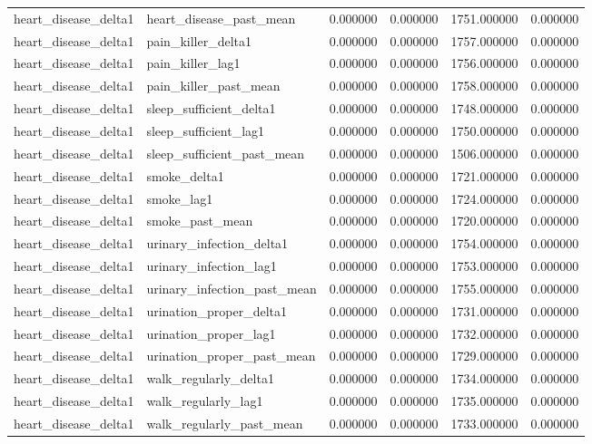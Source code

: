 \begin{longtable}{llrrrr}
heart\_disease\_delta1 & heart\_disease\_past\_mean & 0.000000 & 0.000000 & 1751.000000 & 0.000000 \\
heart\_disease\_delta1 & pain\_killer\_delta1 & 0.000000 & 0.000000 & 1757.000000 & 0.000000 \\
heart\_disease\_delta1 & pain\_killer\_lag1 & 0.000000 & 0.000000 & 1756.000000 & 0.000000 \\
heart\_disease\_delta1 & pain\_killer\_past\_mean & 0.000000 & 0.000000 & 1758.000000 & 0.000000 \\
heart\_disease\_delta1 & sleep\_sufficient\_delta1 & 0.000000 & 0.000000 & 1748.000000 & 0.000000 \\
heart\_disease\_delta1 & sleep\_sufficient\_lag1 & 0.000000 & 0.000000 & 1750.000000 & 0.000000 \\
heart\_disease\_delta1 & sleep\_sufficient\_past\_mean & 0.000000 & 0.000000 & 1506.000000 & 0.000000 \\
heart\_disease\_delta1 & smoke\_delta1 & 0.000000 & 0.000000 & 1721.000000 & 0.000000 \\
heart\_disease\_delta1 & smoke\_lag1 & 0.000000 & 0.000000 & 1724.000000 & 0.000000 \\
heart\_disease\_delta1 & smoke\_past\_mean & 0.000000 & 0.000000 & 1720.000000 & 0.000000 \\
heart\_disease\_delta1 & urinary\_infection\_delta1 & 0.000000 & 0.000000 & 1754.000000 & 0.000000 \\
heart\_disease\_delta1 & urinary\_infection\_lag1 & 0.000000 & 0.000000 & 1753.000000 & 0.000000 \\
heart\_disease\_delta1 & urinary\_infection\_past\_mean & 0.000000 & 0.000000 & 1755.000000 & 0.000000 \\
heart\_disease\_delta1 & urination\_proper\_delta1 & 0.000000 & 0.000000 & 1731.000000 & 0.000000 \\
heart\_disease\_delta1 & urination\_proper\_lag1 & 0.000000 & 0.000000 & 1732.000000 & 0.000000 \\
heart\_disease\_delta1 & urination\_proper\_past\_mean & 0.000000 & 0.000000 & 1729.000000 & 0.000000 \\
heart\_disease\_delta1 & walk\_regularly\_delta1 & 0.000000 & 0.000000 & 1734.000000 & 0.000000 \\
heart\_disease\_delta1 & walk\_regularly\_lag1 & 0.000000 & 0.000000 & 1735.000000 & 0.000000 \\
heart\_disease\_delta1 & walk\_regularly\_past\_mean & 0.000000 & 0.000000 & 1733.000000 & 0.000000 \\

\end{longtable}
